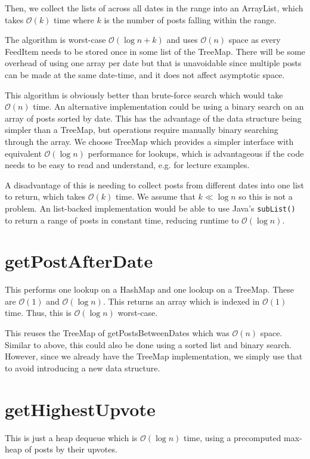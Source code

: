 \documentclass[11pt,a4paper]{article} %
\begin{document}
Then, we collect the lists of across all dates in the range into an ArrayList, which takes 
$\mathcal O(k)$ time where $k$ is the number of posts falling within the range.

The algorithm is worst-case $\mathcal O(\log n + k)$
and uses $\mathcal O(n)$ space as every FeedItem needs to be stored once 
in some list of the TreeMap. There will be some overhead of 
using one array per date but that is unavoidable since multiple posts 
can be made at the same date-time, and it does not affect asymptotic space.

This algorithm is obviously better than brute-force search which 
would take $\mathcal O(n)$ time. An alternative implementation could be using a 
binary search on an array of posts sorted by date. This has the advantage of 
the data structure being simpler than a TreeMap, but operations require manually 
binary searching through the array. We choose TreeMap which provides 
a simpler interface with equivalent $\mathcal O(\log n)$ performance for lookups,
which is advantageous if the code needs to be easy to read and understand,
e.g. for lecture examples.

A disadvantage of this is needing to collect posts from different dates into one 
list to return, which takes $\mathcal O(k)$ time. We assume that $k \ll \log n$ 
so this is not a problem. An list-backed implementation would be able to use Java's
\verb|subList()| to return a range of posts in constant time, reducing runtime to 
$\mathcal O(\log n)$.


\section*{getPostAfterDate}
This performs one lookup on a HashMap and one lookup on a TreeMap. 
These are $\mathcal O(1)$ and $\mathcal O(\log n)$. 
This returns an array
which is indexed in $\mathcal O(1)$ time.
Thus, this is $\mathcal O(\log n)$ worst-case.

This reuses the TreeMap of getPostsBetweenDates which was $\mathcal O(n)$
space. Similar to above, 
this could also be done using a sorted list and binary search. However, since we 
already have the TreeMap implementation, we simply use that to avoid 
introducing a new data structure.

\section*{getHighestUpvote}
This is just a heap dequeue which is $\mathcal O(\log n)$ time,
using a precomputed max-heap of posts by their upvotes. 
\end{document}
